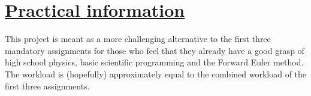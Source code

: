 \documentclass[11pt,british,a4paper]{report}
\begin{document}

\null
\pagestyle{empty}
\newpage

\pagestyle{fancy}
\setcounter{page}{1}
\setcounter{section}{-1}

\section{\underline{Practical information}}
This project is meant as a more challenging alternative to the first three mandatory assignments for those who feel that they already have a good grasp of high school physics, basic scientific programming and the Forward Euler method. The workload is (hopefully) approximately equal to the combined workload of the first three assignments.
\end{document}
